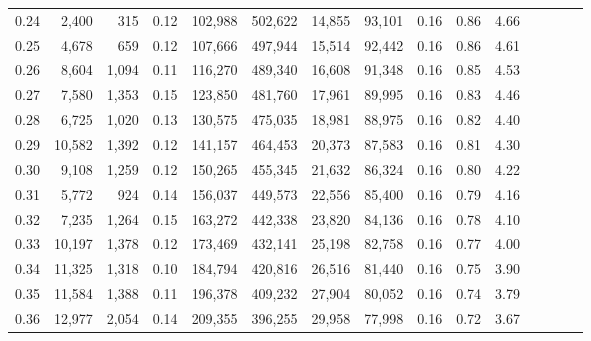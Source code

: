\begin{tabular}{rrrcrrrrrrrrrrr}
0.24 &   2,400 &    315 &                                       0.12 &  102,988 &  502,622 &   14,855 &   93,101 &  0.16 &  0.86 &                         4.66 \\
0.25 &   4,678 &    659 &                                       0.12 &  107,666 &  497,944 &   15,514 &   92,442 &  0.16 &  0.86 &                         4.61 \\
0.26 &   8,604 &  1,094 &                                       0.11 &  116,270 &  489,340 &   16,608 &   91,348 &  0.16 &  0.85 &                         4.53 \\
0.27 &   7,580 &  1,353 &                                       0.15 &  123,850 &  481,760 &   17,961 &   89,995 &  0.16 &  0.83 &                         4.46 \\
0.28 &   6,725 &  1,020 &                                       0.13 &  130,575 &  475,035 &   18,981 &   88,975 &  0.16 &  0.82 &                         4.40 \\
0.29 &  10,582 &  1,392 &                                       0.12 &  141,157 &  464,453 &   20,373 &   87,583 &  0.16 &  0.81 &                         4.30 \\
0.30 &   9,108 &  1,259 &                                       0.12 &  150,265 &  455,345 &   21,632 &   86,324 &  0.16 &  0.80 &                         4.22 \\
0.31 &   5,772 &    924 &                                       0.14 &  156,037 &  449,573 &   22,556 &   85,400 &  0.16 &  0.79 &                         4.16 \\
0.32 &   7,235 &  1,264 &                                       0.15 &  163,272 &  442,338 &   23,820 &   84,136 &  0.16 &  0.78 &                         4.10 \\
0.33 &  10,197 &  1,378 &                                       0.12 &  173,469 &  432,141 &   25,198 &   82,758 &  0.16 &  0.77 &                         4.00 \\
0.34 &  11,325 &  1,318 &                                       0.10 &  184,794 &  420,816 &   26,516 &   81,440 &  0.16 &  0.75 &                         3.90 \\
0.35 &  11,584 &  1,388 &                                       0.11 &  196,378 &  409,232 &   27,904 &   80,052 &  0.16 &  0.74 &                         3.79 \\
0.36 &  12,977 &  2,054 &                                       0.14 &  209,355 &  396,255 &   29,958 &   77,998 &  0.16 &  0.72 &                         3.67 \\

\end{tabular}
